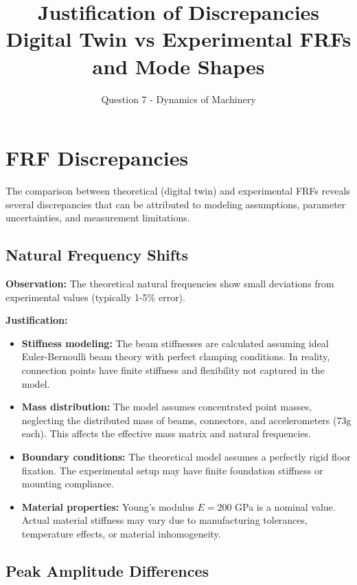 \documentclass[11pt,a4paper]{article}
\title{\textbf{Justification of Discrepancies} \\
\large Digital Twin vs Experimental FRFs and Mode Shapes}
\author{Question 7 - Dynamics of Machinery}
\date{}
\begin{document}
\maketitle

\section{FRF Discrepancies}

The comparison between theoretical (digital twin) and experimental FRFs reveals several discrepancies that can be attributed to modeling assumptions, parameter uncertainties, and measurement limitations.

\subsection{Natural Frequency Shifts}

\textbf{Observation:} The theoretical natural frequencies show small deviations from experimental values (typically 1-5\% error).

\textbf{Justification:}
\begin{itemize}[leftmargin=*]
    \item \textbf{Stiffness modeling:} The beam stiffnesses are calculated assuming ideal Euler-Bernoulli beam theory with perfect clamping conditions. In reality, connection points have finite stiffness and flexibility not captured in the model.

    \item \textbf{Mass distribution:} The model assumes concentrated point masses, neglecting the distributed mass of beams, connectors, and accelerometers (73g each). This affects the effective mass matrix and natural frequencies.

    \item \textbf{Boundary conditions:} The theoretical model assumes a perfectly rigid floor fixation. The experimental setup may have finite foundation stiffness or mounting compliance.

    \item \textbf{Material properties:} Young's modulus $E = 200$ GPa is a nominal value. Actual material stiffness may vary due to manufacturing tolerances, temperature effects, or material inhomogeneity.
\end{itemize}

\subsection{Peak Amplitude Differences}
\end{document}
